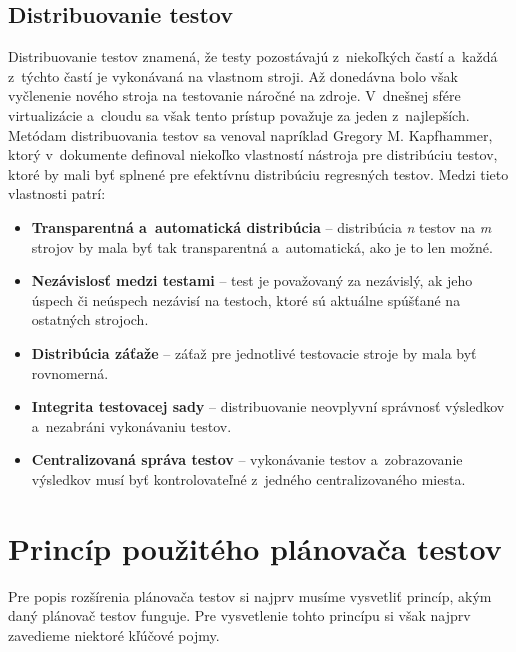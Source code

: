 \subsection*{Distribuovanie testov}
Distribuovanie testov znamená, že testy pozostávajú z~niekoľkých častí 
a~každá z~týchto častí je vykonávaná na vlastnom stroji.
Až donedávna bolo však vyčlenenie nového stroja na testovanie náročné 
na zdroje. V~dnešnej sfére virtualizácie a~cloudu sa však tento prístup 
považuje za jeden z~najlepších. 
Metódam distribuovania testov sa venoval napríklad Gregory M. Kapfhammer, 
ktorý v~dokumente \cite{Kapfhammer} definoval niekoľko vlastností nástroja 
pre distribúciu testov, ktoré by mali byť splnené pre efektívnu 
distribúciu regresných testov. Medzi tieto vlastnosti patrí:
\begin{itemize}
\item \textbf{Transparentná a~automatická distribúcia} -- distribúcia 
\emph{n} testov na \emph{m} strojov by mala byť tak transparentná 
a~automatická, ako je to len možné.
\item \textbf{Nezávislosť medzi testami} -- test je považovaný za 
nezávislý, ak jeho úspech či neúspech nezávisí na testoch, ktoré sú 
aktuálne spúšťané na ostatných strojoch. 
\item \textbf{Distribúcia záťaže} -- záťaž pre jednotlivé testovacie 
stroje by mala byť rovnomerná.
\item \textbf{Integrita testovacej sady} -- distribuovanie neovplyvní 
správnosť výsledkov a~nezabráni vykonávaniu testov.
\item \textbf{Centralizovaná správa testov} -- vykonávanie testov 
a~zobrazovanie výsledkov musí byť kontrolovateľné z~jedného 
centralizovaného miesta.
\end{itemize}




\section{Princíp použitého plánovača testov} 
\label{sekcia:princip_pouziteho_planovaca}
Pre popis rozšírenia plánovača testov si najprv musíme vysvetliť princíp, 
akým daný plánovač testov funguje. Pre vysvetlenie tohto princípu si 
však najprv zavedieme niektoré kľúčové pojmy.

